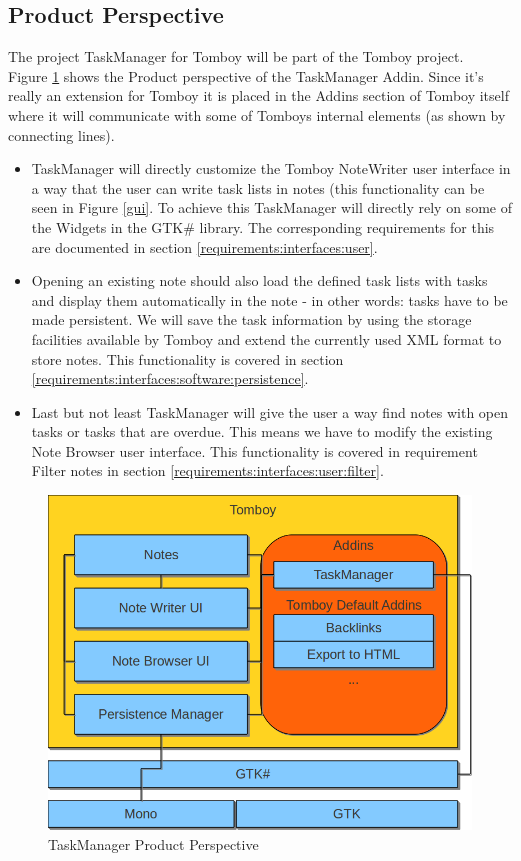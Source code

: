 \subsection{Product Perspective}
\label{description:perspective}
  The project TaskManager for Tomboy will be part of the Tomboy project.\\
  Figure \ref{perspective} shows the Product perspective of the TaskManager Addin. Since it's really an extension for Tomboy it is placed in
  the Addins section of Tomboy itself where it will communicate with some of Tomboys internal elements (as shown by connecting lines).
  \begin{itemize}
    \item TaskManager will directly customize the Tomboy NoteWriter user interface in a way that the user can write task lists in notes 
	(this functionality can be seen in Figure \ref{gui}. To achieve this TaskManager will  directly rely on some of the 
	Widgets in the GTK\# library. The corresponding requirements for this are documented in section \ref{requirements:interfaces:user}.
    \item Opening an existing note should also load the defined task lists with tasks and display them automatically in the note - in other words:
    tasks have to be made persistent.
	We  will save the task information by using the storage facilities available by Tomboy and extend
    the currently used XML  format to store notes. This functionality is covered in section \ref{requirements:interfaces:software:persistence}.
    \item Last but not least TaskManager will give the user a way find notes with open tasks or tasks that are overdue. This means we have to modify
    the existing Note Browser user interface. This functionality is covered in requirement Filter notes in section \ref{requirements:interfaces:user:filter}.
  \end{itemize}


  \begin{figure}[ht]
    \includegraphics[width=\textwidth]{graphics/product_perspective_diagram.png}
    \caption{TaskManager Product Perspective}
    \label{perspective}
  \end{figure}


